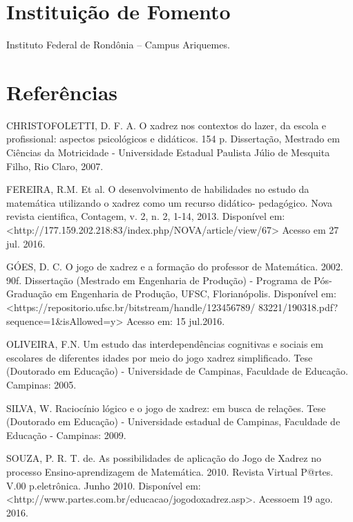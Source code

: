 \documentclass[article,12pt,onesidea,4paper,english,brazil]{abntex2}
\begin{document}
	\section*{Instituição de Fomento}
	
	Instituto Federal de Rondônia – Campus Ariquemes.
	
	\section*{Referências}
	
	CHRISTOFOLETTI, D. F. A. O xadrez nos contextos do lazer, da escola e profissional: aspectos psicológicos e didáticos. 154 p. Dissertação, Mestrado em Ciências da Motricidade
	- Universidade Estadual Paulista Júlio de Mesquita Filho, Rio Claro, 2007.
	
	FEREIRA, R.M. Et al. O desenvolvimento de habilidades no estudo da matemática utilizando o xadrez como um recurso didático- pedagógico. Nova revista cientifica, Contagem, v. 2, n. 2, 1-14, 2013. Disponível em:
	<http://177.159.202.218:83/index.php/NOVA/article/view/67> Acesso em 27 jul. 2016.
	
	GÓES, D. C. O jogo de xadrez e a formação do professor de Matemática. 2002. 90f. Dissertação (Mestrado em Engenharia de Produção) - Programa de Pós-Graduação em Engenharia de Produção, UFSC, Florianópolis. Disponível em:
	<https://repositorio.ufsc.br/bitstream/handle/123456789/
	83221/190318.pdf?sequence=1\&isAllowed=y> Acesso em: 15 jul.2016.
	
	OLIVEIRA, F.N. Um estudo das interdependências cognitivas e sociais em escolares de diferentes idades por meio do jogo xadrez simplificado. Tese (Doutorado em Educação) - Universidade de Campinas, Faculdade de Educação. Campinas: 2005.
	
	SILVA, W. Raciocínio lógico e o jogo de xadrez: em busca de relações. Tese (Doutorado em Educação) - Universidade estadual de Campinas, Faculdade de Educação - Campinas: 2009.
	
	SOUZA, P. R. T. de. As possibilidades de aplicação do Jogo de Xadrez no processo Ensino-aprendizagem de Matemática. 2010. Revista Virtual P@rtes. V.00 p.eletrônica. Junho 2010. Disponível em: <http://www.partes.com.br/educacao/jogodoxadrez.asp>. Acessoem 19 ago. 2016.
	
	
\end{document}

